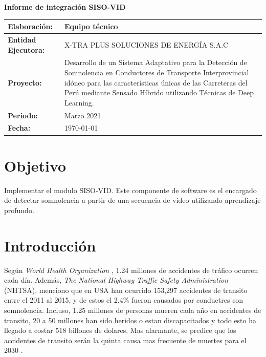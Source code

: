 \documentclass{article}
\begin{document}
	
	\begin{center}	
		\fontsize{15}{15} \textbf{Informe de integración SISO-VID}
	\end{center}
	
	\begin{table}[h]
		\setlength{\tabcolsep}{0.5em} %
		{\renewcommand{\arraystretch}{1.6}%
			\begin{tabular}{|p{4cm}|p{10.8cm}|}
				\hline 
				\textbf{Elaboración:} & Equipo técnico  \\	\hline 
				\textbf{Entidad Ejecutora:} & X-TRA PLUS SOLUCIONES DE ENERGÍA S.A.C  \\	\hline 
				\textbf{Proyecto:} & Desarrollo de un Sistema Adaptativo para la Detección de Somnolencia en Conductores de Transporte Interprovincial idóneo para las características únicas de las Carreteras del Perú mediante Sensado Híbrido utilizando Técnicas de Deep Learning.  \\	\hline 
				\textbf{Periodo:} & Marzo 2021  \\	\hline 
				\textbf{Fecha:} & \today  \\	\hline 
			\end{tabular}
		}
	\end{table}	
	
	
	
	\section{Objetivo}
	
	Implementar el modulo SISO-VID. Este componente de software es el encargado de detectar somnolencia a partir de una secuencia de video utilizando aprendizaje profundo.
	
	\section{Introducción}
	
	Según \textit{World Health Organization} \cite{who}, 1.24 millones de accidentes de tráfico ocurren cada día. Además, \textit{The National Highway Traffic Safety Administration} (NHTSA), menciono que en USA han ocurrido 153,297 accidentes de transito entre el 2011 al 2015, y de estos el 2.4\%  fueron causados por conductres con somnolencia. Incluso, 1.25 millones de personas mueren cada año en accidentes de transito, 20 a 50 millones han sido heridos o estan discapacitados y todo esto ha llegado a costar 518 billones de dolares. Mas alarmante, se predice que los accidentes de transito serán la quinta causa mas frecuente de muertes para el 2030 \citep{asirt}. \\
	
\end{document}

